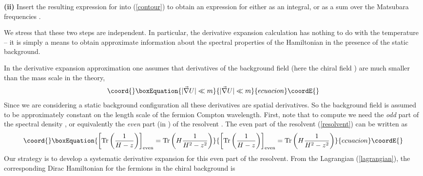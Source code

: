 \documentclass[a4paper,prd,showpacs,showkeys]{revtex4}
\begin{document}
{\bf (ii)} Insert the resulting expression for \coordHE{} into (\ref{contour}) to obtain an expression for \coordHE{} either as an integral, or as a sum over the Matsubara frequencies \coordHE{}. 

We stress that these two steps are independent. In particular, the derivative expansion calculation has nothing to do with the temperature -- it is simply a means to obtain approximate information about the spectral properties of the Hamiltonian in the presence of the static background. 

In the derivative expansion approximation \cite{wilczek,dhoker,derivative} one assumes that
derivatives of the background field (here the chiral field \coordHE{}) are much smaller than the mass scale \coordHE{} in the theory,
\begin{equation}\coord{}\boxEquation{
|\vec{\nabla} U| \ll m
\label{condition}
}{
|\vec{\nabla} U| \ll m
}{ecuacion}\coordE{}\end{equation}
Since we are considering a static background configuration all these derivatives are spatial derivatives.  So the background field is assumed to be approximately constant on the length scale of the fermion Compton wavelength. First, note that to compute \coordHE{} we need the {\it odd} part of the spectral density \coordHE{}, or equivalently the {\it even} part (in \coordHE{}) of the resolvent  \coordHE{}. The even part of the resolvent (\ref{resolvent}) can be written as
\begin{equation}\coord{}\boxEquation{
\left[\textrm{Tr} \left(\frac{1}{H-z}\right) \right]_{\rm{even}} =\textrm{Tr} \left(H \frac{1}{H^2-z^2}\right)
\label{reven}
}{
\left[\textrm{Tr} \left(\frac{1}{H-z}\right) \right]_{\rm{even}} =\textrm{Tr} \left(H \frac{1}{H^2-z^2}\right)
}{ecuacion}\coordE{}\end{equation}
Our strategy is to develop a systematic derivative expansion for this even part of the resolvent.
From the Lagrangian (\ref{lagrangian}), the corresponding Dirac Hamiltonian for the fermions in the chiral background \coordHE{} is
\end{document}

